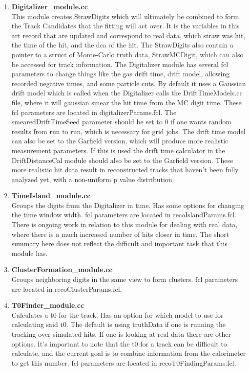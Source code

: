     \begin{enumerate}

          \item{\bf{Digitalizer\_module.cc}} \\
          This module creates StrawDigits which will ultimately be combined to form the Track Candidates that the fitting will act over. It is the variables in this art record that are updated and correspond to real data, which straw was hit, the time of the hit, and the dca of the hit. The StrawDigits also contain a pointer to a struct of Monte-Carlo truth data, StrawMCDigit, which can also be accessed for track information. The Digitalizer module has several fcl parameters to change things like the gas drift time, drift model, allowing recorded negative times, and some particle cuts. By default it uses a Gaussian drift model which is called when the Digitalizer calls the DriftTimeModels.cc file, where it will gaussian smear the hit time from the MC digit time. These fcl parameters are located in digitalizerParams.fcl. The smearedDriftTimeSeed parameter should be set to 0 if one wants random results from run to run, which is necessary for grid jobs. The drift time model can also be set to the Garfield version, which will produce more realistic measurement parameters. If this is used the drift time calculator in the DriftDistanceCal module should also be set to the Garfield version. These more realistic hit data result in reconstructed tracks that haven't been fully analyzed yet, with a non-uniform p value distribution.

          \item{\bf{TimeIsland\_module.cc}} \\
          Groups the digits from the Digitalizer in time. Has some options for changing the time window width. fcl parameters are located in recoIslandParams.fcl. There is ongoing work in relation to this module for dealing with real data, where there is a much increased number of hits closer in time. The short summary here does not reflect the difficult and important task that this module has.

          \item{\bf{ClusterFormation\_module.cc}} \\
          Groups neighboring digits in the same view to form clusters. fcl parameters are located in recoClusterParams.fcl.

          \item{\bf{T0Finder\_module.cc}} \\
          Calculates a t0 for the track. Has an option for which model to use for calculating said t0. The default is using truthData if one is running the tracking over simulated hits. If one is looking at real data there are other options. It's important to note that the t0 for a track can be difficult to calculate, and the current goal is to combine information from the calorimeter to get this number. fcl parameters are located in recoT0FindingParams.fcl.


\end{enumerate}

